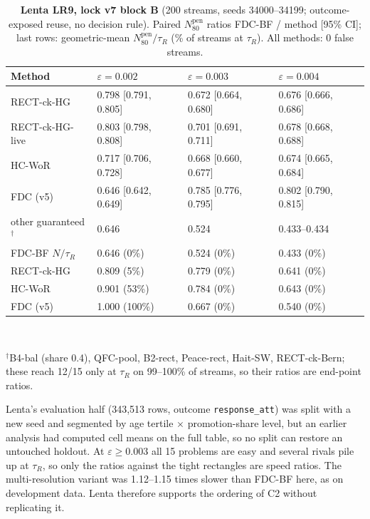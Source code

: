 \documentclass[sigconf,anonymous,review]{acmart}
\newcommand{\eps}{\varepsilon}
\newcommand{\Npen}{N_{80}^{\text{pen}}}
\begin{document}
\begin{table}[H]
\caption{\textbf{Lenta LR9, lock v7 block B} (200 streams, seeds 34000--34199; outcome-exposed reuse, no decision rule). Paired $\Npen$ ratios FDC-BF / method [95\% CI]; last rows: geometric-mean $\Npen/\tau_R$ (\% of streams at $\tau_R$). All methods: 0 false streams.}
\label{tab:lenta}
\footnotesize
\setlength{\tabcolsep}{2pt}
\begin{tabular}{@{}llll@{}}
\toprule
Method & $\eps = 0.002$ & $\eps = 0.003$ & $\eps = 0.004$ \\
\midrule
RECT-ck-HG & 0.798 [0.791, 0.805] & 0.672 [0.664, 0.680] & 0.676 [0.666, 0.686] \\
RECT-ck-HG-live & 0.803 [0.798, 0.808] & 0.701 [0.691, 0.711] & 0.678 [0.668, 0.688] \\
HC-WoR & 0.717 [0.706, 0.728] & 0.668 [0.660, 0.677] & 0.674 [0.665, 0.684] \\
FDC (v5) & 0.646 [0.642, 0.649] & 0.785 [0.776, 0.795] & 0.802 [0.790, 0.815] \\
other guaranteed$^\dagger$ & 0.646 & 0.524 & 0.433--0.434 \\
\midrule
FDC-BF $N/\tau_R$ & 0.646 (0\%) & 0.524 (0\%) & 0.433 (0\%) \\
RECT-ck-HG & 0.809 (5\%) & 0.779 (0\%) & 0.641 (0\%) \\
HC-WoR & 0.901 (53\%) & 0.784 (0\%) & 0.643 (0\%) \\
FDC (v5) & 1.000 (100\%) & 0.667 (0\%) & 0.540 (0\%) \\
\bottomrule
\end{tabular}
\\[2pt]\parbox{\columnwidth}{\footnotesize $^\dagger$B4-bal (share 0.4), QFC-pool, B2-rect, Peace-rect, Hait-SW, RECT-ck-Bern; these reach 12/15 only at $\tau_R$ on 99--100\% of streams, so their ratios are end-point ratios.}
\end{table}

Lenta's evaluation half (343,513 rows, outcome \texttt{response\_att}) was split with a new seed and segmented by age tertile $\times$ promotion-share level, but an earlier analysis had computed cell means on the full table, so no split can restore an untouched holdout. At $\eps \ge 0.003$ all 15 problems are easy and several rivals pile up at $\tau_R$, so only the ratios against the tight rectangles are speed ratios. The multi-resolution variant was 1.12--1.15 times slower than FDC-BF here, as on development data. Lenta therefore supports the ordering of C2 without replicating it.
\end{document}
